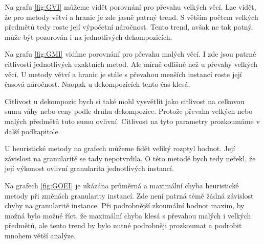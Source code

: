 \documentclass[11pt]{article}
\begin{document}
Na grafu \ref{fig:GVI} můžeme vidět porovnání pro převahu velkých věcí. Lze vidět, že pro metody větví a hranic je zde jasně patrný trend. S větším počtem velkých předmětů tedy roste její výpočetní náročnost. Tento trend, avšak ne tak patný, může být pozorován i na jednotlivých dekompozicích. 

Na grafu \ref{fig:GMI} vidíme porovnání pro převahu malých věcí. I zde jsou patrné citlivosti jednotlivých exaktních metod. Ale mírně odlišně než u převahy velkých věcí. U metody větví a hranic je stále s převahou menších instancí roste její časová náročnost. Naopak u dekompozicích tento čas klesá. 

Citlivost u dekompozic bych si také mohl vysvětlit jako citlivost na celkovou sumu váhy nebo ceny podle druhu dekompozice. Protože převaha velkých nebo malých předmětů tuto sumu ovlivní. Citlivost na tyto parametry prozkoumáme v další podkapitole.

U heuristické metody na grafech můžeme fidět veliký rozptyl hodnot. Její závislost na granularitě se tady nepotvrdila. O této metodě bych tedy neřekl, že její výkonost ovlivní granularita jednotlivých instancí.

Na grafech \ref{fig:GOEI} je ukázána průměrná a maximální chyba heuristické metody při změnách granularity instancí. Zde není patrná témě žádná závislost chyby na granularitě instance. Při podrobnější zkoumální hodnot maxim, by možná bylo možné říct, že maximální chyba klesá s převahou malých i velkých předmětů, ale tento trend by bylo nutné podrobněji prozkoumat a podrobit mnohem větší analýze.
 
\end{document}
